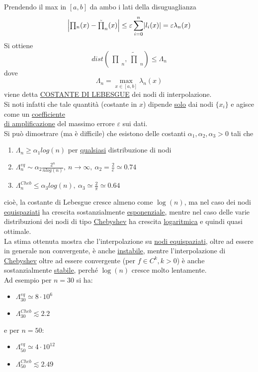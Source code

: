 \documentclass[12pt]{article}
\DeclarePairedDelimiter{\abs}{\lvert}{\rvert}
\newcommand{\inter}{\begin{matrix}\prod\end{matrix}}
\begin{document}
Prendendo il max in $[a,b]$ da ambo i lati della disuguaglianza 
\[ \abs*{\inter_n(x)-\tilde{\inter}_n(x)}\leq \varepsilon  \sum_{i=0}^n \abs{l_i(x)}=\varepsilon\lambda_n(x) \]
Si ottiene
\[ dist\left(\inter_n,\tilde{\inter}_n\right)\leq \Lambda_n \]
dove 
\[\Lambda_n= \max_{x\in[a,b]}\lambda_n(x)\]
viene detta \underline{COSTANTE DI LEBESGUE} dei nodi di interpolazione.\\
Si noti infatti che tale quantità (costante in $x$) dipende \underline{solo} dai nodi $\{ x_i \}$ e agisce come un \underline{coefficiente}\\ \underline{di amplificazione} del massimo errore $\varepsilon$ sui dati.\\
Si può dimostrare (ma è difficile) che esistono delle costanti $\alpha_1, \alpha_2, \alpha_3 > 0$ tali che
\begin{enumerate}
    \item $\Lambda_n \geq \alpha_1 log(n)$ per \underline{qualsiasi} distribuzione di nodi
    \item $\Lambda^{eq}_n \sim \alpha_2 \frac{2^n}{nlog(n)}, \ n \to \infty, \ \alpha_2 = \frac{2}{e} \simeq 0.74$
    \item $\Lambda^{Cheb}_n \leq \alpha_3 log(n), \ \alpha_3 \simeq \frac{2}{\pi} \simeq 0.64$
\end{enumerate}
cioè, la costante di Lebesgue cresce almeno come $\log(n)$, ma nel caso dei nodi \underline{equispaziati} ha crescita sostanzialmente \underline{esponenziale}, mentre nel caso delle varie distribuzioni dei nodi di tipo \underline{Chebyshev} ha crescita \underline{logaritmica} e quindi quasi ottimale.\\
La stima ottenuta mostra che l'interpolazione su \underline{nodi equispaziati}, oltre ad essere in generale non convergente, è anche \underline{instabile}, mentre l'interpolazione di \underline{Chebyshev} oltre ad essere convergente (per $f \in C^k, k>0$) è anche sostanzialmente \underline{stabile}, perché $\log(n)$ cresce molto lentamente.\\
Ad esempio per $n=30$ si ha:
\begin{itemize}
\item $\Lambda^{eq}_{30} \simeq 8 \cdot 10^6$
\item $\Lambda^{Cheb}_{30} \lesssim 2.2$
\end{itemize}
e per $n=50$:
\begin{itemize}
\item $\Lambda^{eq}_{50} \simeq 4 \cdot 10^{12}$
\item $\Lambda^{Cheb}_{50} \lesssim 2.49$
\end{itemize}
\end{document}
